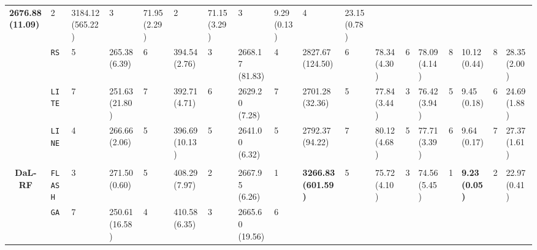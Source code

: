 \begin{tabular}{clllllllllllllllll}
  \multicolumn{1}{l|}{\cellcolor{blue!15}\textbf{2676.88 (11.09)}} &
  2 &
  \multicolumn{1}{l|}{3184.12 (565.22)} &
  3 &
  \multicolumn{1}{l|}{71.95 (2.29)} &
  2 &
  \multicolumn{1}{l|}{71.15 (3.29)} &
  3 &
  \multicolumn{1}{l|}{9.29 (0.13)} &
  4 &
  23.15 (0.78) \\
\multicolumn{1}{c|}{} &
  \multicolumn{1}{l|}{\texttt{RS}} &
  5 &
  \multicolumn{1}{l|}{265.38 (6.39)} &
  6 &
  \multicolumn{1}{l|}{394.54 (2.76)} &
  3 &
  \multicolumn{1}{l|}{2668.17 (81.83)} &
  4 &
  \multicolumn{1}{l|}{2827.67 (124.50)} &
  6 &
  \multicolumn{1}{l|}{78.34 (4.30)} &
  6 &
  \multicolumn{1}{l|}{78.09 (4.14)} &
  8 &
  \multicolumn{1}{l|}{10.12 (0.44)} &
  8 &
  28.35 (2.00) \\
\multicolumn{1}{c|}{} &
  \multicolumn{1}{l|}{\texttt{LITE}} &
  7 &
  \multicolumn{1}{l|}{251.63 (21.80)} &
  7 &
  \multicolumn{1}{l|}{392.71 (4.71)} &
  6 &
  \multicolumn{1}{l|}{2629.20 (7.28)} &
  7 &
  \multicolumn{1}{l|}{2701.28 (32.36)} &
  5 &
  \multicolumn{1}{l|}{77.84 (3.44)} &
  3 &
  \multicolumn{1}{l|}{76.42 (3.94)} &
  5 &
  \multicolumn{1}{l|}{9.45 (0.18)} &
  6 &
  24.69 (1.88) \\
\multicolumn{1}{c|}{} &
  \multicolumn{1}{l|}{\texttt{LINE}} &
  4 &
  \multicolumn{1}{l|}{266.66 (2.06)} &
  5 &
  \multicolumn{1}{l|}{396.69 (10.13)} &
  5 &
  \multicolumn{1}{l|}{2641.00 (6.32)} &
  5 &
  \multicolumn{1}{l|}{2792.37 (94.22)} &
  7 &
  \multicolumn{1}{l|}{80.12 (4.68)} &
  5 &
  \multicolumn{1}{l|}{77.71 (3.39)} &
  6 &
  \multicolumn{1}{l|}{9.64 (0.17)} &
  7 &
  27.37 (1.61) \\
\hline
\multicolumn{1}{l}{\textbf{}} &
    &
    &
    &
    &
    &
    &
    &
    &
    &
    &
    &
    &
    &
    &
    &
    &
    \\ \hline
\multicolumn{1}{c|}{\multirow{9}{*}{\textbf{DaL-RF}}} &
  \multicolumn{1}{l|}{\texttt{FLASH}} &
  3 &
  \multicolumn{1}{l|}{271.50 (0.60)} &
  5 &
  \multicolumn{1}{l|}{408.29 (7.97)} &
  2 &
  \multicolumn{1}{l|}{2667.95 (6.26)} &
  \cellcolor{blue!15}1 &
  \multicolumn{1}{l|}{\cellcolor{blue!15}\textbf{3266.83 (601.59)}} &
  5 &
  \multicolumn{1}{l|}{75.72 (4.10)} &
  3 &
  \multicolumn{1}{l|}{74.56 (5.45)} &
  \cellcolor{blue!15}1 &
  \multicolumn{1}{l|}{\cellcolor{blue!15}\textbf{9.23 (0.05)}} &
  2 &
  22.97 (0.41) \\
\multicolumn{1}{c|}{} &
  \multicolumn{1}{l|}{\texttt{GA}} &
  7 &
  \multicolumn{1}{l|}{250.61 (16.58)} &
  4 &
  \multicolumn{1}{l|}{410.58 (6.35)} &
  3 &
  \multicolumn{1}{l|}{2665.60 (19.56)} &
  6 &

\end{tabular}
